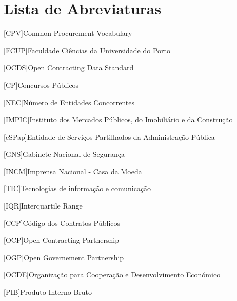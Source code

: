 \chapter*{Lista de Abreviaturas}
\label{chap:abbreviations}

\begin{multicols}{2}[]
	\begin{scriptsize}
        	\begin{acronym}
        		    [CPV]{Common Procurement Vocabulary}
        		    
        		    {Faculdade Ciências da Universidade do Porto}
                    
                    [OCDS]{Open Contracting Data Standard}
                    
                    [CP]{Concursos Públicos}
                    
                    [NEC]{Número de Entidades Concorrentes}       
                                 
                    [IMPIC]{Instituto dos Mercados Públicos, do Imobiliário e da Construção}
                    
                    [eSPap]{Entidade de Serviços Partilhados da Administração Pública}
                    
                    [GNS]{Gabinete Nacional de Segurança}
                    
                    [INCM]{Imprensa Nacional - Casa da Moeda}
                    
                    [TIC]{Tecnologias de informação e comunicação}
                    
                    [IQR]{Interquartile Range}
                                        
                    [CCP]{Código dos Contratos Públicos}
                    
                    [OCP]{Open Contracting Partnership}
                    
                    [OGP]{Open Governement Partnership }
                    
                    [OCDE]{Organização para Cooperação e Desenvolvimento Económico}
                    
                    [PIB]{Produto Interno Bruto}
                    

\end{acronym}
\end{scriptsize}
\end{multicols}
